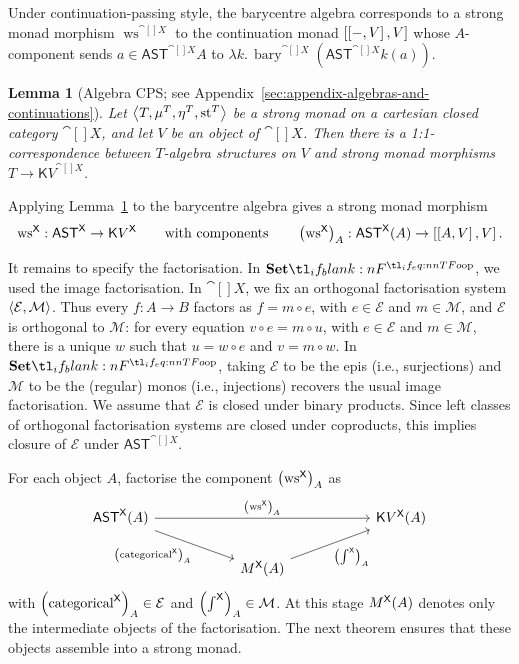 \documentclass[11pt,a4paper]{article}
\newtheorem{lemma}[theorem]{Lemma}
\theoremstyle{definition}
\theoremstyle{remark}
\providecommand{\AST}{\mathsf{AST}}
\providecommand{\categ}{\operatorname{categorical}}
\providecommand{\iwrt}{\int}
\providecommand{\ws}{\operatorname{ws}}
\providecommand{\bary}{\operatorname{bary}}
\providecommand{\cont}{\mathsf{K}}
\providecommand{\str}{\operatorname{st}}
\begin{document}
Under continuation-passing style, the barycentre algebra corresponds to a strong monad morphism $\ws^{\cat[]{X}}$ to the continuation monad $\left[\left[-,V\right],V\right]$ whose \(A\)-component sends \(a \in \AST^{\cat[]{X}}A\) to \(\lambda k.\,\bary^{\cat[]{X}}\!\left(\AST^{\cat[]{X}}k(a)\right)\).
\begin{lemma}[Algebra CPS; see Appendix~\ref{sec:appendix-algebras-and-continuations}]
	\label{lem:algebras-and-strong-monad-morphisms-to-the-continuation-monad}
	Let \( \tuple{T, \mu^{T}, \eta^{T}, \str^{T}} \) be a strong monad on a
	cartesian closed category \( \cat[]{X} \), and let \( V \) be an object of
	\( \cat[]{X} \). Then there is a 1:1-correspondence between
	\( T \)-algebra structures on \( V \) and strong monad morphisms
	\( T \to \cont{V}^{\cat[]{X}} \).
\end{lemma}

Applying Lemma~\ref{lem:algebras-and-strong-monad-morphisms-to-the-continuation-monad}
to the barycentre algebra gives a strong monad morphism
\[
\ws^{\cat[]{X}}:
\AST^{\cat[]{X}}
\to
\cont{V}^{\cat[]{X}}
\qquad\textnormal{with components}\qquad
\Nat[nn]{ \ws^{\cat[]{X}} }{ A }:
\Fun[nn]{ \AST^{\cat[]{X}} }{ A }
\to
\inthom{\inthom{A}{V}}{V}.
\]

It remains to specify the factorisation. In \( \Set \), we
used the image factorisation. In \( \cat[]{X} \), we fix an orthogonal
factorisation system \( \left\langle \mathcal{E},\mathcal{M}\right\rangle \). Thus every
 \(f:A\to B\) factors as \(f=m\circ e\), with
\(e\in\mathcal{E}\) and \(m\in\mathcal{M}\), and
\( \mathcal{E} \) is orthogonal to \( \mathcal{M} \): for every equation
\(v\circ e=m\circ u\), with \(e\in\mathcal{E}\) and \(m\in\mathcal{M}\), there
is a unique \(w\) such that \(u=w\circ e\) and \(v=m\circ w\). In \( \Set \),
taking \( \mathcal{E} \) to be the epis (i.e., surjections) and \( \mathcal{M} \) to be the
(regular) monos (i.e., injections) recovers the usual image factorisation.
We assume that \( \mathcal{E} \) is closed under binary products. Since
left classes of orthogonal factorisation systems are closed under coproducts,
this implies closure of \( \mathcal{E} \) under \( \AST^{\cat[]{X}} \).

For each object \(A\), factorise the component
\( \Nat[nn]{\ws^{\cat[]{X}}}{A} \) as
\[
\begin{tikzcd}[column sep = 2 cm]
	\Fun[nn]{ \AST^{\cat[]{X}} }{ A }
	&&
	\Fun[nn]{ \cont{V}^{\cat[]{X}} }{ A }
	\\
	& \Fun[nn]{ M^{\cat[]{X}} }{ A } &
	\arrow[from = 1-1, to = 1-3, "{\Nat[nn]{ \ws^{\cat[]{X}} }{ A }}"]
	\arrow[from = 1-1, to = 2-2, swap, "{\Nat[nn]{ \categ^{\cat[]{X}} }{ A }}"]
	\arrow[from = 2-2, to = 1-3, swap, "{\Nat[nn]{ \iwrt^{\cat[]{X}} }{ A }}"]
\end{tikzcd}
\]
with \( \Nat[nn]{ \categ^{\cat[]{X}} }{ A }\in\mathcal{E} \) and
\( \Nat[nn]{ \iwrt^{\cat[]{X}} }{ A }\in\mathcal{M} \). At this stage
\( \Fun[nn]{ M^{\cat[]{X}} }{ A } \) denotes only the intermediate objects of
the factorisation. The next theorem ensures that these objects
assemble into a strong monad.
\end{document}
